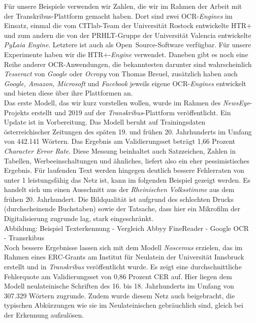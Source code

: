 \documentclass{article}
\begin{document}
        Für unsere Beispiele verwenden wir Zahlen, die wir im Rahmen der Arbeit mit der
                  Transkribus-Plattform gemacht haben. Dort sind zwei OCR-\emph{Engines} im Einsatz, einmal die vom CITlab-Team der Universität Rostock
                  entwickelte HTR+ und zum andern die von der PRHLT-Gruppe der Universität Valencia
                  entwickelte \emph{PyLaia Engine}. Letztere ist auch als
                  Open Source-Software verfügbar. Für unsere Experimente haben wir die HTR+-\emph{Engine} verwendet. Daneben gibt es noch eine Reihe anderer
                  OCR-Anwendungen, die bekanntesten darunter sind wahrscheinlich \emph{Tesseract} von \emph{Google} oder \emph{Ocropy} von Thomas Breuel, zusätzlich haben auch \emph{Google,
                     Amazon, Microsoft} und \emph{Facebook} jeweils eigene
                     OCR-\emph{Engines} entwickelt und bieten diese über ihre
                  Plattformen an.\\
            
        Das erste Modell, das wir kurz vorstellen wollen, wurde im Rahmen des \emph{NewsEye}-Projekts erstellt und 2019 auf der \emph{Transkribus}-Plattform veröffentlicht. Ein Update ist in Vorbereitung. Das
                  Modell beruht auf Trainingsdaten österreichischer Zeitungen des späten 19. und
                  frühen 20. Jahrhunderts im Umfang von 442.141 Wörtern. Das Ergebnis am
                  Validierungsset beträgt 1,66 Prozent \emph{Character Error Rate}.
                  Diese Messung beinhaltet auch Satzzeichen, Zahlen in Tabellen, Werbeeinschaltungen
                  und ähnliches, liefert also ein eher pessimistisches Ergebnis. Für laufenden Text
                  werden hingegen deutlich bessere Fehlerraten von unter 1%
                  leistungsfähig das Netz ist, kann im folgenden Beispiel gezeigt werden. Es handelt
                  sich um einen Ausschnitt aus der \emph{Rheinischen Volksstimme}
                  aus dem frühen 20. Jahrhundert. Die Bildqualität ist aufgrund des schlechten
                  Drucks (durchscheinende Buchstaben) sowie der Tatsache, dass hier ein Mikrofilm
                  der Digitalisierung zugrunde lag, stark eingeschränkt. \\
            
        Abbildung: Beispiel Texterkennung - Vergleich Abbyy
                           FineReader - Google OCR - Transrkibus\\
            
        Noch bessere Ergebnisse lassen sich mit dem Modell \emph{Noscemus}
                  erzielen, das im Rahmen eines ERC-Grants am Institut für Neulatein der Universität
                  Innsbruck erstellt und in \emph{Transkribus} veröffentlicht wurde.
                  Es zeigt eine durchschnittliche Fehlerquote am Validierungsset von 0,86 Prozent
                  CER auf. Hier liegen dem Modell neulateinische Schriften des 16. bis 18.
                  Jahrhunderts im Umfang von 307.329 Wörtern zugrunde. Zudem wurde diesem Netz auch
                  beigebracht, die typischen Abkürzungen wie sie im Neulateinischen gebräuchlich
                  sind, gleich bei der Erkennung aufzulösen.\\
            
\end{document}
